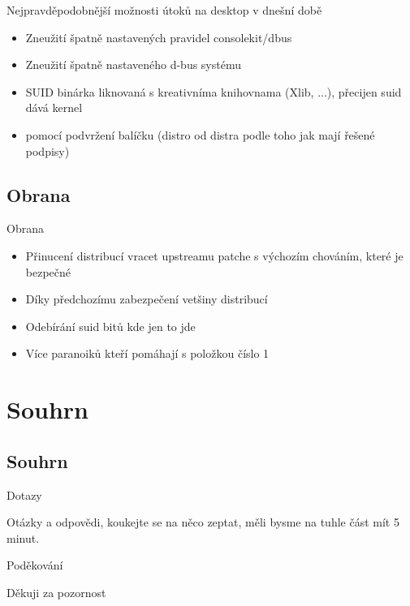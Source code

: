 \documentclass{beamer}
\begin{document}
\begin{frame}{Nejpravděpodobnější možnosti útoků na desktop v dnešní době}
	\begin{itemize}
		\item Zneužití špatně nastavených pravidel consolekit/dbus
		\item Zneužití špatně nastaveného d-bus systému
		\item SUID binárka liknovaná s kreativníma knihovnama (Xlib, ...), přecijen suid dává kernel
		\item pomocí podvržení balíčku (distro od distra podle toho jak mají řešené podpisy)
	\end{itemize}
\end{frame}

\subsection{Obrana}

\begin{frame}{Obrana}
	\begin{itemize}
		\item Přinucení distribucí vracet upstreamu patche s výchozím chováním, které je bezpečné
		\item Díky předchozímu zabezpečení vetšiny distribucí
		\item Odebírání suid bitů kde jen to jde
		\item Více paranoiků kteří pomáhají s položkou číslo 1
	\end{itemize}
\end{frame}

\section{Souhrn}

\subsection{Souhrn}

\begin{frame}{Dotazy}
	\begin{center}Otázky a odpovědi, koukejte se na něco zeptat, měli bysme na tuhle část mít 5 minut.\end{center}
\end{frame}

\begin{frame}{Poděkování}
	\begin{center}Děkuji za pozornost\end{center}
\end{frame}
\end{document}
